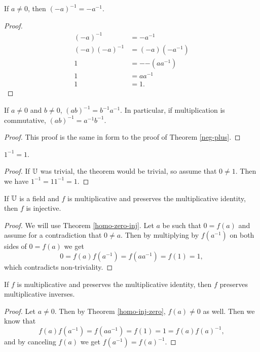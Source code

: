 \documentclass[../math.tex]{subfiles}
\begin{document}
\begin{theorem}
    If $a \neq 0$, then $(-a)^{-1} = -a^{-1}$.
\end{theorem}
\begin{proof}
    \begin{align*}
        (-a)^{-1} &= -a^{-1} \\
        (-a)(-a)^{-1} &= (-a)(-a^{-1}) \\
        1 &= -{-(aa^{-1})} \\
        1 &= aa^{-1} \\
        1 &= 1.
    \end{align*}
\end{proof}

\begin{theorem}
    If $a \neq 0$ and $b \neq 0$, $(ab)^{-1} = b^{-1}a^{-1}$.  In particular, if
    multiplication is commutative, $(ab)^{-1} = a^{-1}b^{-1}$.
\end{theorem}
\begin{proof}
    This proof is the same in form to the proof of Theorem \ref{neg-plus}.
\end{proof}

\begin{theorem}
    $1^{-1} = 1$.
\end{theorem}
\begin{proof}
    If $\mathbb{U}$ was trivial, the theorem would be trivial, so assume that $0 \neq
    1$.  Then we have $1^{-1} = 1 1^{-1} = 1$.
\end{proof}

\begin{instance}
    If $\mathbb{U}$ is a field and $f$ is multiplicative and preserves the
    multiplicative identity, then $f$ is injective.
\end{instance}
\begin{proof}
    We will use Theorem \ref{homo-zero-inj}.  Let $a$ be such that $0 = f(a)$
    and assume for a contradiction that $0 \neq a$.  Then by multiplying by
    $f(a^{-1})$ on both sides of $0 = f(a)$ we get \[
        0 = f(a) f(a^{-1}) = f(a a^{-1}) = f(1) = 1,
    \]
    which contradicts non-triviality.
\end{proof}

\begin{instance}
    If $f$ is multiplicative and preserves the multiplicative identity, then $f$
    preserves multiplicative inverses.
\end{instance}
\begin{proof}
    Let $a \neq 0$.  Then by Theorem \ref{homo-inj-zero}, $f(a) \neq 0$ as well.
    Then we know that \[
        f(a) f(a^{-1}) = f(a a^{-1}) = f(1) = 1 = f(a) f(a)^{-1},
    \]
    and by canceling $f(a)$ we get $f(a^{-1}) = f(a)^{-1}$.
\end{proof}
\end{document}
